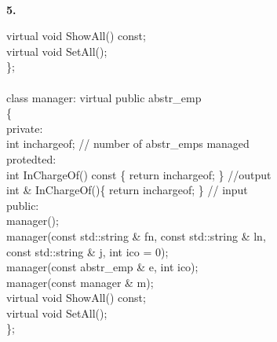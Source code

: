 \documentclass[10 pt]{amsart}
\newlength{\cwidth}
\newenvironment{cpart}[2][\cwidth]
	{%
		\\ %
		\textbf{#2. }%
		\begin{minipage}[t]{#1}%
		\setlength{\parindent}{0pt}%
		\setlength{\parskip}{2ex}%
	}
	{%
		\end{minipage}%
	}
\begin{document}
\begin{cpart}{5}
{\begin{tabbing}
					virtual void ShowAll() const; \\
					virtual void SetAll(); \\
				\< \}; \\
				\- \\
				class manager: virtual public abstr\_emp \\
				\{
				\+ \\
				\< private: \\
					int inchargeof; \hspace{10ex} 
						// number of abstr\_emps managed \\
				\< protedted: \\
					int InChargeOf() const \{ return inchargeof; \}
						//output \\
					int \& InChargeOf()\{ return inchargeof; \} 
						// input \\
				\< public: \\
					manager(); \\
					manager(const std::string \& fn, const std::string \& ln, \\
					\phantom{manager(}const std::string \& j, int ico = 0); \\
					manager(const abstr\_emp \& e, int ico); \\
					manager(const manager \& m); \\
					virtual void ShowAll() const; \\
					virtual void SetAll(); \\
				\< \}; \\
			\end{tabbing}
		}
	\end{cpart}
	\newpage
\end{document}
